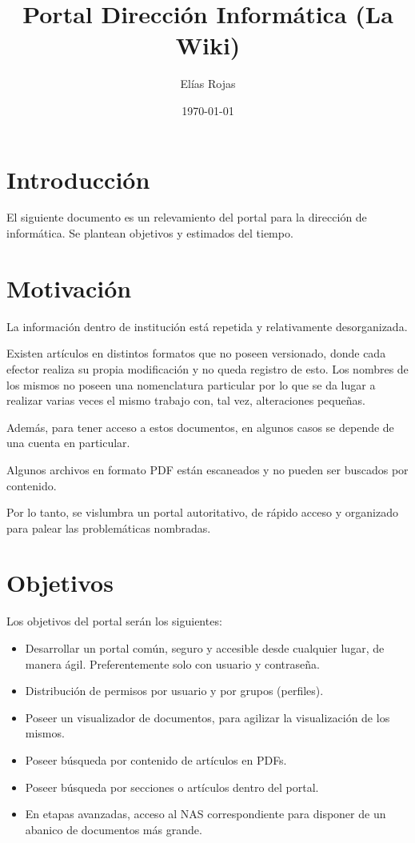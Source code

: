 \documentclass{article}
\title{Portal Dirección Informática (La Wiki)}
\author{Elías Rojas}
\date{\today}
\begin{document}
\maketitle

\tableofcontents

\section{Introducción}
El siguiente documento es un relevamiento del portal para la dirección de informática. Se plantean objetivos y estimados del tiempo.

\section{Motivación}
La información dentro de institución está repetida y relativamente desorganizada.

Existen artículos en distintos formatos que no poseen versionado, donde cada efector realiza su propia modificación y 
no queda registro de esto. Los nombres de los mismos no poseen una nomenclatura particular por lo que se da lugar
a realizar varias veces el mismo trabajo con, tal vez, alteraciones pequeñas.

Además, para tener acceso a estos documentos, en algunos casos se depende de una cuenta en particular.

Algunos archivos en formato PDF están escaneados y no pueden ser buscados por contenido.

Por lo tanto, se vislumbra un portal autoritativo, de rápido acceso y organizado para palear las problemáticas nombradas.

\section{Objetivos}
Los objetivos del portal serán los siguientes:
\begin{itemize}
    \item Desarrollar un portal común, seguro y accesible desde cualquier lugar, de manera ágil. Preferentemente solo con usuario y contraseña.
    \item Distribución de permisos por usuario y por grupos (perfiles). 
    \item Poseer un visualizador de documentos, para agilizar la visualización de los mismos.
    \item Poseer búsqueda por contenido de artículos en PDFs.
    \item Poseer búsqueda por secciones o artículos dentro del portal.
    \item En etapas avanzadas, acceso al NAS correspondiente para disponer de un abanico de documentos más grande.
\end{itemize}
\end{document}

